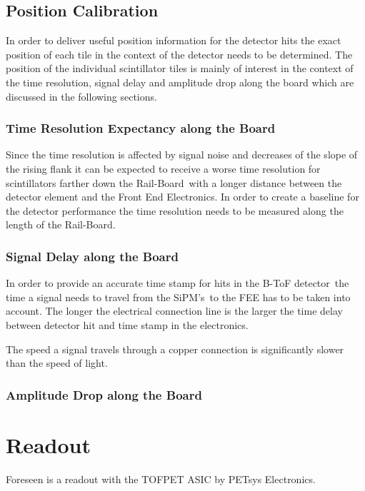 \documentclass[12pt,a4paper,oneside]{article}
\newcommand{\btofD}{B-ToF detector}
\newcommand{\railboard}{Rail-Board}
\newcommand{\sipms}{SiPM's}
\begin{document}
\subsection{Position Calibration}

In order to deliver useful position information for the detector hits the exact position of each tile in the context of the detector needs to be determined.
The position of the individual scintillator tiles is mainly of interest in the context of the time resolution, signal delay and amplitude drop along the board which are discussed in the following sections.

\subsubsection{Time Resolution Expectancy along the Board}

Since the time resolution is affected by signal noise and decreases of the slope of the rising flank it can be expected to receive a worse time resolution for scintillators farther down the \railboard\ with a longer distance between the detector element and the Front End Electronics.
In order to create a baseline for the detector performance the time resolution needs to be measured along the length of the \railboard .

\subsubsection{Signal Delay along the Board}

In order to provide an accurate time stamp for hits in the \btofD\ the time a signal needs to travel from the \sipms\ to the FEE has to be taken into account. The longer the electrical connection line is the larger the time delay between detector hit and time stamp in the electronics.

The speed a signal travels through a copper connection is significantly slower than the speed of light.

\subsubsection{Amplitude Drop along the Board}


\section{Readout}

Foreseen is a readout with the TOFPET ASIC by PETsys Electronics.


\newpage
\listoftodos
\end{document}

